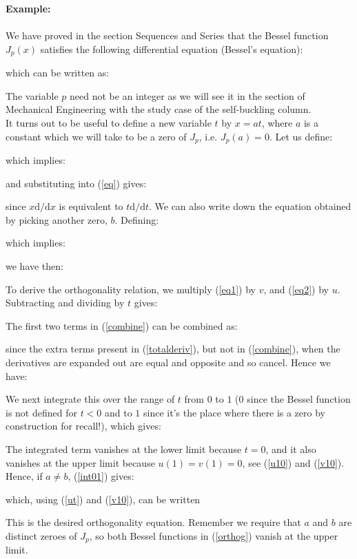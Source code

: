 	\begin{tcolorbox}[colframe=black,colback=white,sharp corners]
	\textbf{{\Large {}}Example:}\\\\
	We have proved in the section Sequences and Series that the Bessel function $J_p(x)$ satisfies the following differential equation (Bessel's equation):
	
	which can be written as:
	
	The variable $p$ need not be an integer as we will see it in the section of Mechanical Engineering with the study case of the self-buckling column.\\
	
	It turns out to be useful to define a new variable $t$ by $x = a t$, where $a$ is a constant which we will take to be a zero of $J_p$, i.e. $J_p(a) = 0$. Let us define:
	
	which implies:
	
	and substituting into (\ref{eq}) gives:
	
	since $x \mathrm{d}/\mathrm{d}x$ is equivalent to $t \mathrm{d}/\mathrm{d}t$.
	We can also write down the equation obtained by picking another zero, $b$. Defining:
	
	which implies:
	
	we have then:
	
	To derive the orthogonality relation, we multiply (\ref{eq1}) by $v$, and (\ref{eq2}) by $u$. Subtracting and dividing by $t$ gives:
	\end{tcolorbox}
	
	\begin{tcolorbox}[colframe=black,colback=white,sharp corners]
	
	The first two terms in (\ref{combine}) can be combined as:
	
	since the extra terms present in (\ref{totalderiv}), but not in (\ref{combine}), when the derivatives are expanded out are equal and opposite and so cancel. Hence we have:
	
	We next integrate this over the range of $t$ from $0$ to $1$ ($0$ since the Bessel function is not defined for $t<0$ and to $1$ since it's the place where there is a zero by construction for recall!), which gives:
	
	The integrated term vanishes at the lower limit because $t=0$, and it also vanishes at the upper limit because $u(1) = v(1) = 0$, see (\ref{u10}) and (\ref{v10}). Hence, if $a \ne b$, (\ref{int01}) gives:
	
	which, using (\ref{ut}) and (\ref{v10}), can be written
	
	This is the desired orthogonality equation. Remember we require that $a$ and $ b$ are distinct zeroes of $J_p$, so both Bessel functions in (\ref{orthog}) vanish at the upper limit.
	\end{tcolorbox}
	

